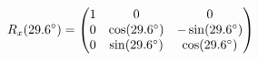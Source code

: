 \documentclass[preview]{standalone}
\begin{document}
\begin{align*}
\special{dvisvgm:raw <g id='unique000'>}R_x(29.6^\circ) = \begin{pmatrix} 1 & 0 & 0 \\ 0 & \cos(29.6^\circ) & -\sin(29.6^\circ) \\ 0 & \sin(29.6^\circ) & \cos(29.6^\circ) \end{pmatrix}\special{dvisvgm:raw </g>}
\end{align*}
\end{document}
